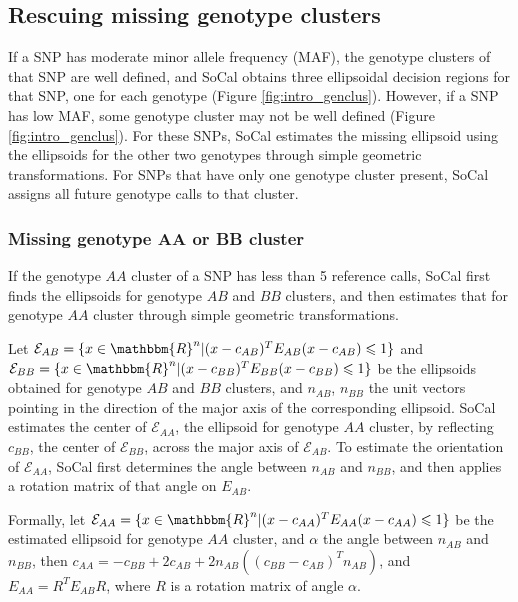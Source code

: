 \documentclass{scrartcl}
\begin{document}
\subsection{Rescuing missing genotype clusters}

\par
If a SNP has moderate minor allele frequency (MAF), the genotype clusters of
that SNP are well defined, and SoCal obtains three ellipsoidal decision
regions for that SNP, one for each genotype (Figure \ref{fig:intro_genclus}).
However, if a SNP has low MAF, some genotype cluster may not be well defined 
(Figure \ref{fig:intro_genclus}).
For these SNPs, SoCal estimates the missing ellipsoid using the ellipsoids for
the other two genotypes through simple geometric transformations.
For SNPs that have only one genotype cluster present, SoCal assigns all future
genotype calls to that cluster.

\subsubsection{Missing genotype AA or BB cluster}

\par
If the genotype $AA$ cluster of a SNP has less than 5 reference calls, SoCal
first finds the ellipsoids for genotype $AB$ and $BB$ clusters, and then
estimates that for genotype $AA$ cluster through simple geometric
transformations.

\par
Let $\mathcal{E}_{AB}=
\{x \in \mathbbm{R}^{n}|(x-c_{AB})^TE_{AB}(x-c_{AB}) \leqslant 1\}$
and $\mathcal{E}_{BB}=
\{x \in \mathbbm{R}^{n}|(x-c_{BB})^TE_{BB}(x-c_{BB}) \leqslant 1\}$
be the ellipsoids obtained for genotype $AB$ and $BB$ clusters,
and $n_{AB}$, $n_{BB}$ the unit vectors pointing in the direction of
the major axis of the corresponding ellipsoid.
SoCal estimates the center of $\mathcal{E}_{AA}$, the ellipsoid for genotype
$AA$ cluster, by reflecting $c_{BB}$, the center of $\mathcal{E}_{BB}$, across
the major axis of $\mathcal{E}_{AB}$.
To estimate the orientation of $\mathcal{E}_{AA}$, SoCal first determines the
angle between $n_{AB}$ and $n_{BB}$, and then applies a rotation matrix of
that angle on $E_{AB}$.

\par
Formally, let $\mathcal{E}_{AA}=
\{x \in \mathbbm{R}^{n}|(x-c_{AA})^TE_{AA}(x-c_{AA}) \leqslant 1\}$ be the
estimated ellipsoid for genotype $AA$ cluster, and $\alpha$ the angle between
$n_{AB}$ and $n_{BB}$, then
$c_{AA}=-c_{BB}+2c_{AB}+2n_{AB}((c_{BB}-c_{AB})^{T}n_{AB})$, and
$E_{AA}=R^{T}E_{AB}R$, where $R$ is a rotation matrix of angle $\alpha$.
\end{document}

